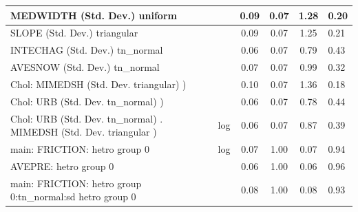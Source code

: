\begin{table}
\begin{center}
\begin{tabular}{|l|l|c|c|c|l|}
			\hline
			MEDWIDTH (Std. Dev.) uniform &  & 0.09 & 0.07 & 1.28 & 0.20 \\
			\hline
			SLOPE (Std. Dev.) triangular &  & 0.09 & 0.07 & 1.25 & 0.21 \\
			\hline
			INTECHAG (Std. Dev.) tn_normal &  & 0.06 & 0.07 & 0.79 & 0.43 \\
			\hline
			AVESNOW (Std. Dev.) tn_normal &  & 0.07 & 0.07 & 0.99 & 0.32 \\
			\hline
			 Chol: MIMEDSH (Std. Dev. triangular) ) &  & 0.10 & 0.07 & 1.36 & 0.18 \\
			\hline
			 Chol: URB (Std. Dev. tn_normal) ) &  & 0.06 & 0.07 & 0.78 & 0.44 \\
			\hline
			 Chol: URB (Std. Dev. tn_normal) . MIMEDSH (Std. Dev.   triangular ) & log & 0.06 & 0.07 & 0.87 & 0.39 \\
			\hline
			main: FRICTION: hetro group 0 & log & 0.07 & 1.00 & 0.07 & 0.94 \\
			\hline
			AVEPRE: hetro group 0 &  & 0.06 & 1.00 & 0.06 & 0.96 \\
			\hline
			main: FRICTION: hetro group 0:tn_normal:sd  hetro group 0 &  & 0.08 & 1.00 & 0.08 & 0.93 \\
			\hline
		\end{tabular}
	\end{center}
\end{table}